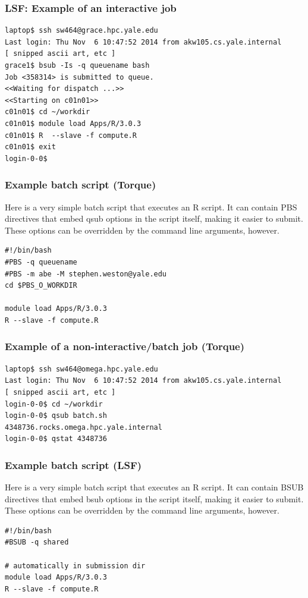 \documentclass[10pt]{beamer}
\begin{document}
\begin{frame}[fragile]
\frametitle{LSF: Example of an interactive job}
\begin{verbatim}
laptop$ ssh sw464@grace.hpc.yale.edu
Last login: Thu Nov  6 10:47:52 2014 from akw105.cs.yale.internal
[ snipped ascii art, etc ]
grace1$ bsub -Is -q queuename bash
Job <358314> is submitted to queue.
<<Waiting for dispatch ...>>
<<Starting on c01n01>>
c01n01$ cd ~/workdir
c01n01$ module load Apps/R/3.0.3
c01n01$ R  --slave -f compute.R
c01n01$ exit 
login-0-0$ 
\end{verbatim}
\end{frame}

\begin{frame}[fragile]
\frametitle{Example batch script (Torque)}
Here is a very simple batch script that executes an R script.
It can contain PBS directives that embed qsub options
in the script itself, making it easier to submit.  These options
can be overridden by the command line arguments, however.

\begin{block}{}
\begin{verbatim}
#!/bin/bash
#PBS -q queuename
#PBS -m abe -M stephen.weston@yale.edu
cd $PBS_O_WORKDIR

module load Apps/R/3.0.3
R --slave -f compute.R
\end{verbatim}
\end{block}
\end{frame}

\begin{frame}[fragile]
\frametitle{Example of a non-interactive/batch job (Torque)}
\begin{verbatim}
laptop$ ssh sw464@omega.hpc.yale.edu
Last login: Thu Nov  6 10:47:52 2014 from akw105.cs.yale.internal
[ snipped ascii art, etc ]
login-0-0$ cd ~/workdir
login-0-0$ qsub batch.sh
4348736.rocks.omega.hpc.yale.internal
login-0-0$ qstat 4348736
\end{verbatim}
\end{frame}

\begin{frame}[fragile]
\frametitle{Example batch script (LSF)}
Here is a very simple batch script that executes an R script.
It can contain BSUB directives that embed bsub options
in the script itself, making it easier to submit.  These options
can be overridden by the command line arguments, however.

\begin{block}{}
\begin{verbatim}
#!/bin/bash
#BSUB -q shared

# automatically in submission dir
module load Apps/R/3.0.3
R --slave -f compute.R
\end{verbatim}
\end{block}
\end{frame}
\end{document}
